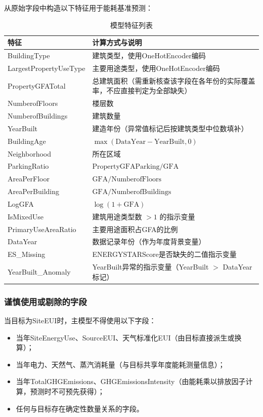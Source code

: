 从原始字段中构造以下特征用于能耗基准预测：

\begin{table}[H]
\centering
\caption{模型特征列表}
\label{tab:features}
\begin{tabular}{p{5cm}p{7cm}}
\hline
\textbf{特征} & \textbf{计算方式与说明} \\
\hline
BuildingType & 建筑类型，使用OneHotEncoder编码 \\
\hline
LargestPropertyUseType & 主要用途类型，使用OneHotEncoder编码 \\
\hline
PropertyGFATotal & 总建筑面积（需重新核查该字段在各年份的实际覆盖率，不应直接判定为全部缺失） \\
\hline
NumberofFloors & 楼层数 \\
\hline
NumberofBuildings & 建筑数量 \\
\hline
YearBuilt & 建造年份（异常值标记后按建筑类型中位数填补） \\
\hline
BuildingAge & $\max(\text{DataYear} - \text{YearBuilt}, 0)$ \\
\hline
Neighborhood & 所在区域 \\
\hline
ParkingRatio & $\text{PropertyGFAParking} / \text{GFA}$ \\
\hline
AreaPerFloor & $\text{GFA} / \text{NumberofFloors}$ \\
\hline
AreaPerBuilding & $\text{GFA} / \text{NumberofBuildings}$ \\
\hline
LogGFA & $\log(1 + \text{GFA})$ \\
\hline
IsMixedUse & 建筑用途类型数 $> 1$ 的指示变量 \\
\hline
PrimaryUseAreaRatio & 主要用途面积占GFA的比例 \\
\hline
DataYear & 数据记录年份（作为年度背景变量） \\
\hline
ES\_Missing & ENERGYSTARScore是否缺失的二值指示变量 \\
\hline
YearBuilt\_Anomaly & YearBuilt异常的指示变量（YearBuilt $>$ DataYear 标记） \\
\hline
\end{tabular}
\end{table}

\subsubsection{谨慎使用或剔除的字段}

当目标为SiteEUI时，主模型不得使用以下字段：
\begin{itemize}
    \item 当年SiteEnergyUse、SourceEUI、天气标准化EUI（由目标直接派生或换算）；
    \item 当年电力、天然气、蒸汽消耗量（与目标共享年度能耗测量信息）；
    \item 当年TotalGHGEmissions、GHGEmissionsIntensity（由能耗乘以排放因子计算，预测时不可预先获得）；
    \item 任何与目标存在确定性数量关系的字段。
\end{itemize}

